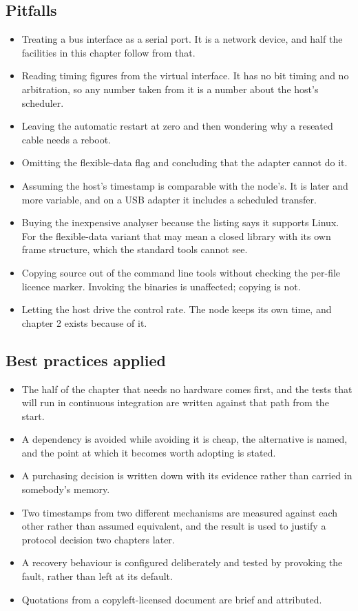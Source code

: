 \subsection*{Pitfalls}

\begin{itemize}
\item Treating a bus interface as a serial port. It is a network device, and
half the facilities in this chapter follow from that.
\item Reading timing figures from the virtual interface. It has no bit timing
and no arbitration, so any number taken from it is a number about the host's
scheduler.
\item Leaving the automatic restart at zero and then wondering why a reseated
cable needs a reboot.
\item Omitting the flexible-data flag and concluding that the adapter cannot do
it.
\item Assuming the host's timestamp is comparable with the node's. It is later
and more variable, and on a USB adapter it includes a scheduled transfer.
\item Buying the inexpensive analyser because the listing says it supports
Linux. For the flexible-data variant that may mean a closed library with its own
frame structure, which the standard tools cannot see.
\item Copying source out of the command line tools without checking the per-file
licence marker. Invoking the binaries is unaffected; copying is not.
\item Letting the host drive the control rate. The node keeps its own time, and
chapter 2 exists because of it.
\end{itemize}

\subsection*{Best practices applied}

\begin{itemize}
\item The half of the chapter that needs no hardware comes first, and the tests
that will run in continuous integration are written against that path from the
start.
\item A dependency is avoided while avoiding it is cheap, the alternative is
named, and the point at which it becomes worth adopting is stated.
\item A purchasing decision is written down with its evidence rather than
carried in somebody's memory.
\item Two timestamps from two different mechanisms are measured against each
other rather than assumed equivalent, and the result is used to justify a
protocol decision two chapters later.
\item A recovery behaviour is configured deliberately and tested by provoking
the fault, rather than left at its default.
\item Quotations from a copyleft-licensed document are brief and attributed.
\end{itemize}

